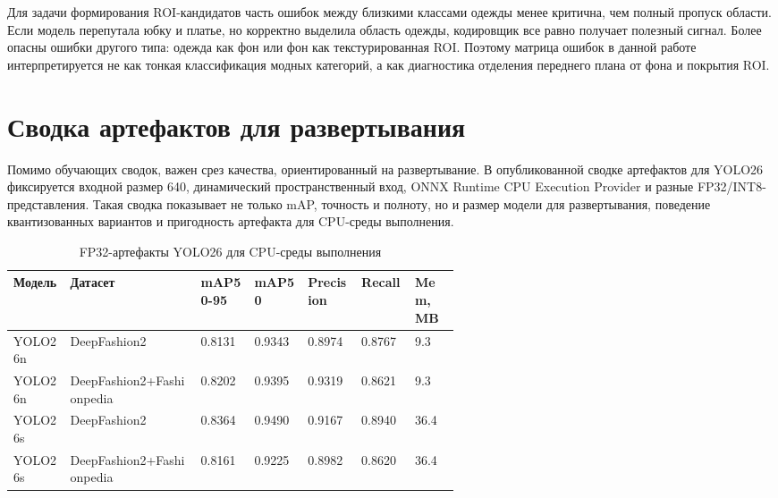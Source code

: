 \documentclass[12pt,a4paper,oneside,openany]{report}
\begin{document}
Для задачи формирования ROI-кандидатов часть ошибок между близкими классами одежды менее критична, чем полный пропуск области. Если модель перепутала юбку и платье, но корректно выделила область одежды, кодировщик все равно получает полезный сигнал. Более опасны ошибки другого типа: одежда как фон или фон как текстурированная ROI. Поэтому матрица ошибок в данной работе интерпретируется не как тонкая классификация модных категорий, а как диагностика отделения переднего плана от фона и покрытия ROI.

\section{Сводка артефактов для развертывания}

Помимо обучающих сводок, важен срез качества, ориентированный на развертывание. В опубликованной сводке артефактов для YOLO26 фиксируется входной размер 640, динамический пространственный вход, ONNX Runtime CPU Execution Provider и разные FP32/INT8-представления. Такая сводка показывает не только mAP, точность и полноту, но и размер модели для развертывания, поведение квантизованных вариантов и пригодность артефакта для CPU-среды выполнения.

\begin{table}[H]\centering\caption{FP32-артефакты YOLO26 для CPU-среды выполнения}\label{tab:yolo_model_zoo_artifacts}\scriptsize\begin{tabularx}{\linewidth}{@{}lY C{0.12\linewidth}C{0.12\linewidth}C{0.12\linewidth}C{0.12\linewidth}C{0.10\linewidth}@{}}\toprule
Модель & Датасет & mAP50-95 & mAP50 & Precision & Recall & Mem, MB \\
\midrule
YOLO26n & DeepFashion2 & 0.8131 & 0.9343 & 0.8974 & 0.8767 & 9.3 \\
YOLO26n & DeepFashion2+Fashionpedia & 0.8202 & 0.9395 & 0.9319 & 0.8621 & 9.3 \\
YOLO26s & DeepFashion2 & 0.8364 & 0.9490 & 0.9167 & 0.8940 & 36.4 \\
YOLO26s & DeepFashion2+Fashionpedia & 0.8161 & 0.9225 & 0.8982 & 0.8620 & 36.4 \\
\bottomrule\end{tabularx}
\end{table}
\end{document}
